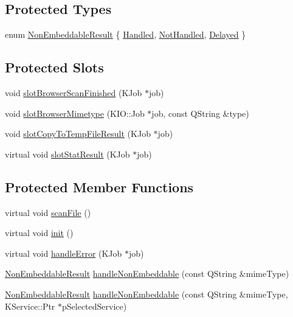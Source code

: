 \subsection*{Protected Types}
\begin{DoxyCompactItemize}
\item 
enum \hyperlink{classKParts_1_1BrowserRun_af7f4f75d5ab28c3183f9f5ee96b8a79f}{Non\+Embeddable\+Result} \{ \hyperlink{classKParts_1_1BrowserRun_af7f4f75d5ab28c3183f9f5ee96b8a79fa1489069cb381b59c2de0d501e347388e}{Handled}, 
\hyperlink{classKParts_1_1BrowserRun_af7f4f75d5ab28c3183f9f5ee96b8a79fae968cb6de73d4c96f7644a55adf610ca}{Not\+Handled}, 
\hyperlink{classKParts_1_1BrowserRun_af7f4f75d5ab28c3183f9f5ee96b8a79fa7a4f366bf6b4319caab0e48610f5e26c}{Delayed}
 \}
\end{DoxyCompactItemize}
\subsection*{Protected Slots}
\begin{DoxyCompactItemize}
\item 
void \hyperlink{classKParts_1_1BrowserRun_abed6cac6df3f2147be76a0524e92ddc1}{slot\+Browser\+Scan\+Finished} (K\+Job $\ast$job)
\item 
void \hyperlink{classKParts_1_1BrowserRun_a549306dfbb92c12c97a1663b82d93a51}{slot\+Browser\+Mimetype} (K\+I\+O\+::\+Job $\ast$job, const Q\+String \&type)
\item 
void \hyperlink{classKParts_1_1BrowserRun_a43d7f0c6a27c25ba93d6085162574d7e}{slot\+Copy\+To\+Temp\+File\+Result} (K\+Job $\ast$job)
\item 
virtual void \hyperlink{classKParts_1_1BrowserRun_a27fc9f400c6eccf2188d5899550af89a}{slot\+Stat\+Result} (K\+Job $\ast$job)
\end{DoxyCompactItemize}
\subsection*{Protected Member Functions}
\begin{DoxyCompactItemize}
\item 
virtual void \hyperlink{classKParts_1_1BrowserRun_a78858ebd1b73ece426abc128edf4e4e5}{scan\+File} ()
\item 
virtual void \hyperlink{classKParts_1_1BrowserRun_a6140fdc2848021232a3c84a5df98b130}{init} ()
\item 
virtual void \hyperlink{classKParts_1_1BrowserRun_a2b961dffc73904a1b7fde816a49bb05f}{handle\+Error} (K\+Job $\ast$job)
\item 
\hyperlink{classKParts_1_1BrowserRun_af7f4f75d5ab28c3183f9f5ee96b8a79f}{Non\+Embeddable\+Result} \hyperlink{classKParts_1_1BrowserRun_ad1b275632b2bc76378879a15ac548706}{handle\+Non\+Embeddable} (const Q\+String \&mime\+Type)
\item 
\hyperlink{classKParts_1_1BrowserRun_af7f4f75d5ab28c3183f9f5ee96b8a79f}{Non\+Embeddable\+Result} \hyperlink{classKParts_1_1BrowserRun_a7fbb390d0f47884e704ebe77f5148808}{handle\+Non\+Embeddable} (const Q\+String \&mime\+Type, K\+Service\+::\+Ptr $\ast$p\+Selected\+Service)
\end{DoxyCompactItemize}


